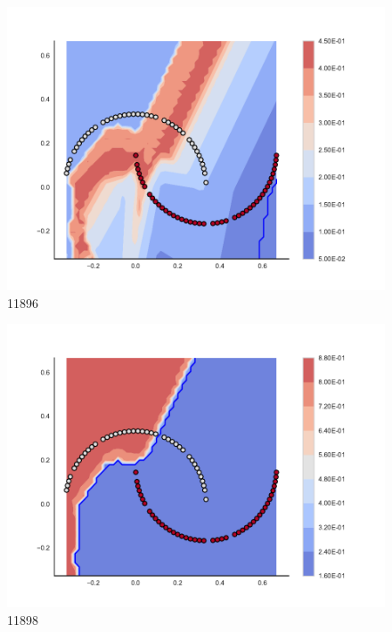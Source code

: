 \begin{subfigure}[b]{0.09\textwidth}
    \includegraphics[clip, trim=2.35cm 1.75cm 4.5cm 0cm,width=\textwidth]{img/convergence/11896.pdf}
    \caption{11896}
    \label{fig:convergence_11896}
\end{subfigure}
%
\begin{subfigure}[b]{0.09\textwidth}
    \includegraphics[clip, trim=2.35cm 1.75cm 4.5cm 0cm,width=\textwidth]{img/convergence/11898.pdf}
    \caption{11898}
    \label{fig:convergence_11898}
\end{subfigure}
%
